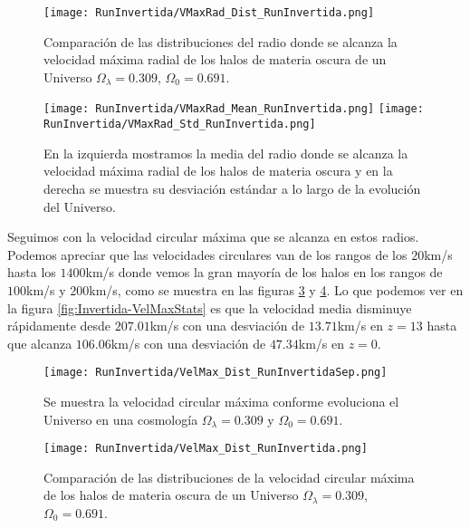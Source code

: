 \begin{figure}[H]
    \centering
    \texttt{[image: RunInvertida/VMaxRad\_Dist\_RunInvertida.png]}
    \caption[Distribución del radio donde se alcanza la velocidad máxima radial]{\footnotesize Comparación de las distribuciones del radio donde se alcanza la velocidad máxima radial de los halos de materia oscura de un Universo $\Omega_\lambda = 0.309 $, $\Omega_0 = 0.691$.}
    \label{fig:Invertida-VMaxRadDist}
\end{figure}

\begin{figure}[H]
    \centering
    \texttt{[image: RunInvertida/VMaxRad\_Mean\_RunInvertida.png]}
    \texttt{[image: RunInvertida/VMaxRad\_Std\_RunInvertida.png]}
    \caption[Media y desviación estándar del Radio donde se alcanza la velocidad máxima radial]{\footnotesize En la izquierda mostramos la media del radio donde se alcanza la velocidad máxima radial de los halos de materia oscura y en la derecha se muestra su desviación estándar a lo largo de la evolución del Universo.}
    \label{fig:Invertida-VMaxRadStats}
\end{figure}

Seguimos con la velocidad circular máxima que se alcanza en estos radios. Podemos apreciar que las velocidades circulares van de los rangos de los $20$km/s hasta los $1400$km/s donde vemos la gran mayoría de los halos en los rangos de $100$km/s y $200$km/s, como se muestra en las figuras \ref{fig:Invertida-VelMaxDistSep} y \ref{fig:Invertida-VelMaxDist}. Lo que podemos ver en la figura \ref{fig:Invertida-VelMaxStats} es que la velocidad  media disminuye rápidamente desde $207.01$km/s con una desviación de $13.71$km/s en $z=13$ hasta que alcanza $106.06$km/s con una desviación de $47.34$km/s en $z=0$. 

\begin{figure}[H]
    \centering
    \texttt{[image: RunInvertida/VelMax\_Dist\_RunInvertidaSep.png]}
    \caption[Velocidad circular máxima]{\footnotesize Se muestra la velocidad circular máxima conforme evoluciona el Universo en una cosmología $\Omega_\lambda = 0.309 $ y $\Omega_0 = 0.691$.}
    \label{fig:Invertida-VelMaxDistSep}
\end{figure}

\begin{figure}[H]
    \centering
    \texttt{[image: RunInvertida/VelMax\_Dist\_RunInvertida.png]}
    \caption[Distribución de la velocidad circular máxima]{\footnotesize Comparación de las distribuciones de la velocidad circular máxima de los halos de materia oscura de un Universo $\Omega_\lambda = 0.309 $, $\Omega_0 = 0.691$.}
    \label{fig:Invertida-VelMaxDist}
\end{figure}


